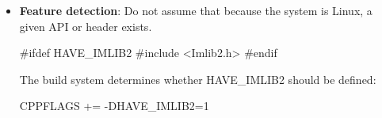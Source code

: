 \documentclass{report}
\begin{document}
\begin{itemize}
        \item \textbf{Feature detection}: Do not assume that because the system is Linux, a given API or header exists.
            \bigbreak \noindent 
            \begin{cppcode}
                #ifdef HAVE_IMLIB2
                #include <Imlib2.h>
                #endif
            \end{cppcode}
            \bigbreak \noindent 
            The build system determines whether HAVE\_IMLIB2 should be defined:
            \bigbreak \noindent 
            \begin{cppcode}
            CPPFLAGS += -DHAVE_IMLIB2=1
            \end{cppcode}





    \end{itemize}







    
\end{document}
